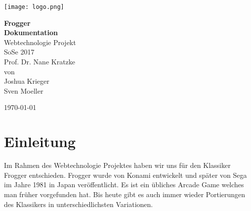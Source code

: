 \documentclass[a4paper,10pt]{report}
\newcommand{\Sven}{Sven Moeller }
\newcommand{\Josh}{Joshua Krieger }
\newcommand{\Prof}{Prof. Dr. Nane Kratzke }
\newcommand{\Topic}{Webtechnologie Projekt \\ SoSe 2017 }
\begin{document}

  \begin{titlepage}
    \centering
    \texttt{[image: logo.png]}					%
    \par 																%
    \vspace{1cm}														%
    \LARGE \textbf{Frogger \\ Dokumentation \\}  						%
    \vspace{2cm}									%
    \Huge \Topic \\				 				 	%
    \vspace{1cm}									%
    \Large \Prof \\									%
    \vspace{1cm}									%
    \small von \\ 
    \Josh \\ 
    \Sven \\
    \vfill
    {\small \today \par}
  \end{titlepage}
  
  
  	\newpage
  	\setcounter{page}{0}
  	\tableofcontents



	\newpage 
	\listoffigures
	


  	\listoftables
  	
	
	\lstlistoflistings	
	

    \newpage
    \chapter{Einleitung}
    {
    	Im Rahmen des Webtechnologie Projektes haben wir uns für den Klassiker Frogger entschieden.
    	Frogger wurde von Konami entwickelt und später von Sega im Jahre 1981 in Japan veröffentlicht.
    	Es ist ein übliches Arcade Game welches man früher vorgefunden hat. Bis heute gibt es auch immer wieder Portierungen
    	des Klassikers in unterschiedlichsten Variationen.  
    }
\end{document}
